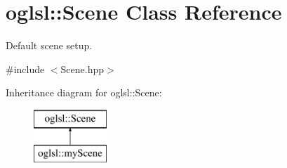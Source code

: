 \hypertarget{classoglsl_1_1_scene}{}\section{oglsl\+:\+:Scene Class Reference}
\label{classoglsl_1_1_scene}


Default scene setup.  




{\ttfamily \#include $<$Scene.\+hpp$>$}

Inheritance diagram for oglsl\+:\+:Scene\+:\begin{figure}[H]
\begin{center}
\leavevmode
\includegraphics[height=2.000000cm]{classoglsl_1_1_scene}
\end{center}
\end{figure}
